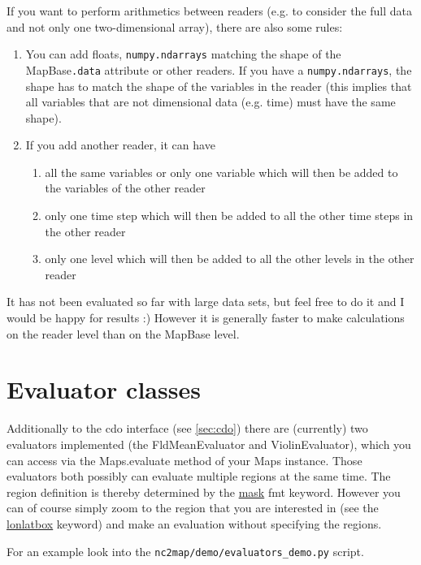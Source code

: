 If you want to perform arithmetics between readers (e.g. to consider the full data and not only one two-dimensional array), there are also some rules:
\begin{enumerate}
	\item You can add floats, \lstinline|numpy.ndarrays| matching the shape of the \gls{MapBase}\lstinline|.data| attribute or other \glspl{reader}. If you have a \lstinline|numpy.ndarrays|, the shape has to match the shape of the variables in the reader (this implies that all variables that are not dimensional data (e.g. \gls{time}) must have the same shape).
	\item If you add another \gls{reader}, it can have 
	\begin{enumerate}
		\item all the same variables or only one variable which will then be added to the variables of the other \gls{reader}
		\item only one time step which will then be added to all the other time steps in the other \gls{reader}
		\item only one level which will then be added to all the other levels in the other \gls{reader}
	\end{enumerate}
\end{enumerate}
It has not been evaluated so far with large data sets, but feel free to do it and I would be happy for results :) However it is generally faster to make calculations on the \gls{reader} level than on the \gls{MapBase} level.

\section{Evaluator classes} \label{sec:evaluators}
Additionally to the cdo interface (see \autoref{sec:cdo}) there are (currently) two evaluators implemented (the \gls{FldMeanEvaluator} and \gls{ViolinEvaluator}), which you can access via the \gls{Maps.evaluate} method of your \gls{Maps} instance. Those evaluators both possibly can evaluate multiple regions at the same time. The region definition is thereby determined by the \hyperref[item:mask]{mask} \gls{fmt} keyword. However you can of course simply zoom to the region that you are interested in (see the \hyperref[item:lonlatbox]{lonlatbox} keyword) and make an evaluation without specifying the regions.

For an example look into the \lstinline|nc2map/demo/evaluators_demo.py| script.